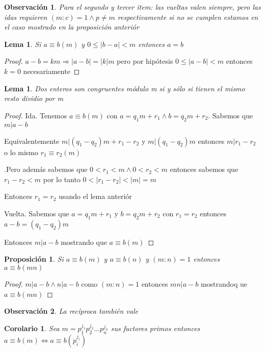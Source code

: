 \documentclass{article}
\theoremstyle{break}
\newtheorem{corollary}{Corolario}[theorem]
\newtheorem{lemma}[theorem]{Lema}
\newtheorem{proposition}{Proposición}
\newtheorem*{remark}{Observación}
\begin{document}
        \begin{remark}
            Para el segundo y tercer item: las vueltas valen siempre, pero las idas requieren $(m:c) = 1 \land p\neq m$ respectivamente
            si no se cumplen estamos en el caso mostrado en la proposición anteriór
        \end{remark}

        \begin{lemma}
            Si $a\equiv b(m)$ y $0\leq |b-a| <m$ entonces $a=b$
        \end{lemma}
        \begin{proof}
            $a-b=km \Rightarrow |a-b| = |k|m$ pero por hipótesis $0 \leq |a-b| < m$ entonces $k=0$ 
            necesariamente
        \end{proof}
            
        \begin{lemma}
            Dos enteros son congruentes módulo m si y sólo si tienen el mismo resto dividio por m
        \end{lemma}
        \begin{proof}
            Ida. Tenemos $a\equiv b (m)$ con $a=q_1m+r_1 \land b=q_2m +r_2$. Sabemos que $m|a-b$

            Equivalentemente $m|(q_1 - q_2)m +r_1-r_2$ y $m|(q_1-q_2)m$ entonces $m|r_1-r_2$ o lo mismo 
            $r_1\equiv r_2 (m)$
            
            .Pero además sabemos que $0<r_1 <m \land 0<r_2 <m$ entonces sabemos que $r_1 -r_2 < m $
            por lo tanto $0<|r_1-r_2|<|m| = m$ 

            Entonces $r_1 = r_2$ usando el lema anteriór

            Vuelta. Sabemos que $a = q_1m + r_1$ y $b=q_2m+r_2$ con $r_1=r_2$ entonces $a-b = (q_1 -q_2)m$

            Entonces $m|a-b$ mostrando que $a\equiv b (m)$
        \end{proof}

        \begin{proposition}
            Si $a\equiv b (m)$ y $a\equiv b (n)$ y $(m:n) = 1$ entonces $a\equiv b (mn)$
        \end{proposition}
        \begin{proof}
            $m|a-b \land n|a-b$ como $(m:n) =1$ entonces $mn|a-b$ mostrandoq ue $a\equiv b(mn)$
        \end{proof}
        \begin{remark}
            La recíproca también vale
        \end{remark}
        \begin{corollary}
            Sea $m=p_1^{j_1}p_2^{j_2}\ldots p_n^{j_n}$ sus factores primos entonces $a\equiv b(m)\iff a\equiv b(p_i^{j_i})$
        \end{corollary}
\end{document}
